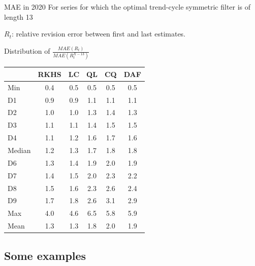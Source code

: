 \documentclass[10pt,xcolor=table,color={dvipsnames,usenames},ignorenonframetext,usepdftitle=false,english]{beamer}
\newcommand\1{\mathds{1}}
\begin{document}
\begin{frame}{MAE in 2020}
\protect\hypertarget{mae-in-2020}{}
For series for which the optimal trend-cycle symmetric filter is of
length 13

\(R_t\): relative revision error between first and last estimates.

Distribution of \(\frac{MAE(R_t)}{MAE(R_t^{X-13})}\)

\footnotesize



\begin{table}
\centering
\begin{tabular}[t]{lDEFFF}
\toprule
  & \textbf<2>{RKHS} & \textbf<3>{LC} & \textbf<4>{QL} & \textbf<4>{CQ} & \textbf<4>{DAF}\\
\midrule
{Min} & {0.4} & {0.5} & {0.5} & {0.5} & {0.5}\\
D1 & 0.9 & 0.9 & 1.1 & 1.1 & 1.1\\
{D2} & {1.0} & {1.0} & {1.3} & {1.4} & {1.3}\\
D3 & 1.1 & 1.1 & 1.4 & 1.5 & 1.5\\
{D4} & {1.1} & {1.2} & {1.6} & {1.7} & {1.6}\\
Median & 1.2 & 1.3 & 1.7 & 1.8 & 1.8\\
{D6} & {1.3} & {1.4} & {1.9} & {2.0} & {1.9}\\
D7 & 1.4 & 1.5 & 2.0 & 2.3 & 2.2\\
{D8} & {1.5} & {1.6} & {2.3} & {2.6} & {2.4}\\
D9 & 1.7 & 1.8 & 2.6 & 3.1 & 2.9\\
{Max} & {4.0} & {4.6} & {6.5} & {5.8} & {5.9}\\
Mean & 1.3 & 1.3 & 1.8 & 2.0 & 1.9\\
\bottomrule
\end{tabular}
\end{table}
\end{frame}

\hypertarget{some-examples}{%
\subsection{Some examples}\label{some-examples}}
\end{document}
